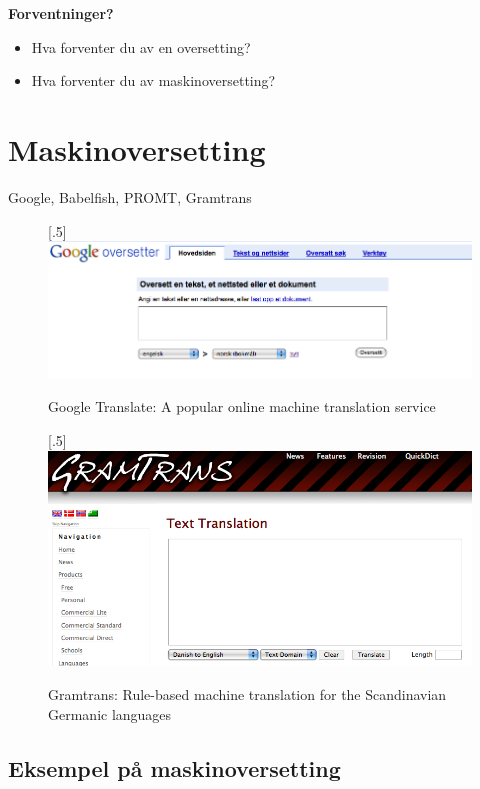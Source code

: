 \documentclass[a4paper,english,12pt]{article}
\begin{document}
\begin{spacing}{1.0}
\textbf{Forventninger?}
 
\begin{itemize}
\item Hva forventer du av en oversetting?
\item Hva forventer du av maskinoversetting?
\end{itemize}


\section{Maskinoversetting}

Google, Babelfish, PROMT, Gramtrans


\begin{figure}
\centering
\scalebox{.5}[.5]{\includegraphics{google.png}} \\
  \caption{Google Translate: A popular online machine translation service}
\end{figure}
\begin{figure}
\centering
\scalebox{.5}[.5]{\includegraphics{gramtrans.png}}
  \caption{Gramtrans: Rule-based machine translation for the Scandinavian Germanic languages}
\end{figure}

\subsection{Eksempel på maskinoversetting}


\end{spacing}
\end{document}
